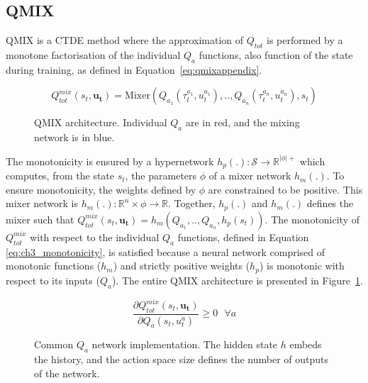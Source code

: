 \subsection{QMIX} 
QMIX \citep{Rashid2018} is a CTDE method where the approximation of $Q_{tot}$ is performed by a monotone factorisation of the individual $Q_a$ functions, also function of the state during training, as defined in Equation~\ref{eq:qmixappendix}.

\begin{equation}
     Q_{tot}^{mix}(s_t, \mathbf{u_t})=\text{Mixer} \left(Q_{a_1}(\tau^{a_1}_t, u_t^{a_1}) ,..,Q_{a_n}(\tau^{a_n}_t, u_t^{a_n}), s_t\right)
     \label{eq:qmixappendix}
\end{equation}

\begin{figure}
\centering

\caption{QMIX architecture. Individual $Q_a$ are in red, and the mixing network is in blue.}
\label{fig:qmix}
\end{figure}

The monotonicity is ensured by a hypernetwork \citep{Ha2016HyperNetworks} $h_p(.): \mathcal{S} \rightarrow \mathbb{R}^{|\phi|+}$ which computes, from the state $s_t$, the parameters $\phi$ of a mixer network $h_m(.)$.
To ensure monotonicity, the weights defined by $\phi$ are constrained to be positive.
This mixer network is $h_m(.): \mathbb{R}^n \times \phi \rightarrow \mathbb{R}$.
Together, $h_p(.)$ and $h_m(.)$ defines the mixer such that $ Q_{tot}^{mix}(s_t, \mathbf{u_t}) = h_m\left(Q_{a_1},..,Q_{a_n}, h_p(s_t)\right)$.
The monotonicity of $Q_{tot}^{mix}$ with respect to the individual $Q_a$ functions, defined in Equation \ref{eq:ch3_monotonicity}, is satisfied because a neural network comprised of monotonic functions ($h_m$) and strictly positive weights ($h_p$) is monotonic with respect to its inputs ($Q_a$). 
The entire QMIX architecture is presented in Figure~\ref{fig:qmix}.

\begin{equation}
    \frac{\partial Q_{tot}^{mix}(s_t, \mathbf{u_t})}{\partial Q_{a}(s_t, u_t^{a})} \geq 0 \text{ } \forall a
    \label{eq:ch3_monotonicity}
\end{equation}

\begin{figure}
    \centering

\caption{Common $Q_a$ network implementation. The hidden state $h$ embeds the history, and the action space size defines the number of outputs of the network.}
\label{fig:ch3_indivQ}
\end{figure}

